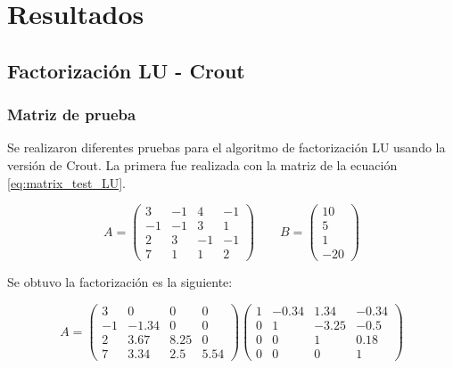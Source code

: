 \section{Resultados}

\subsection{Factorización LU - Crout}

\subsubsection{Matriz de prueba}

Se realizaron diferentes pruebas para el algoritmo de factorización LU usando la versión de Crout. La primera fue realizada con la matriz de la ecuación \ref{eq:matrix_test_LU}.

\begin{equation}
    A= \begin{pmatrix}
        3  & -1 & 4  & -1 \\
        -1 & -1 & 3  & 1  \\
        2  & 3  & -1 & -1 \\
        7  & 1  & 1  & 2
    \end{pmatrix} \qquad
    B = \begin{pmatrix}
        10 \\
        5  \\
        1  \\
        -20
    \end{pmatrix}
    \label{eq:matrix_test_LU}
\end{equation}

Se obtuvo la factorización es la siguiente:

\begin{equation}
    A = \begin{pmatrix}
        3  & 0     & 0    & 0    \\
        -1 & -1.34 & 0    & 0    \\
        2  & 3.67  & 8.25 & 0    \\
        7  & 3.34  & 2.5  & 5.54
    \end{pmatrix}
    \begin{pmatrix}
        1 & -0.34 & 1.34  & -0.34 \\
        0 & 1     & -3.25 & -0.5  \\
        0 & 0     & 1     & 0.18  \\
        0 & 0     & 0     & 1
    \end{pmatrix}
\end{equation}


